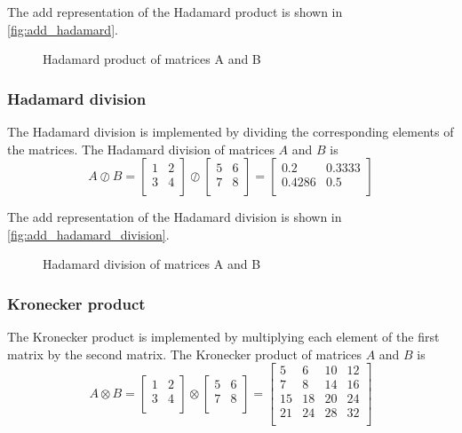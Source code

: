 The \gls{add} representation of the Hadamard product is shown in \autoref{fig:add_hadamard}.
\begin{figure}
    \centering
    
    \caption{Hadamard product of matrices A and B}
    \label{fig:add_hadamard}
\end{figure}

\subsubsection{Hadamard division}
The Hadamard division is implemented by dividing the corresponding elements of the matrices.
The Hadamard division of matrices $A$ and $B$ is
\[
A \oslash B = \begin{bmatrix}
    1 & 2 \\
    3 & 4 \\
\end{bmatrix} \oslash \begin{bmatrix}
    5 & 6 \\
    7 & 8 \\
\end{bmatrix} = \begin{bmatrix}
    0.2 & 0.3333 \\
    0.4286 & 0.5 \\
\end{bmatrix}
\]

The \gls{add} representation of the Hadamard division is shown in \autoref{fig:add_hadamard_division}.
\begin{figure}
    \centering
    
    \caption{Hadamard division of matrices A and B}
    \label{fig:add_hadamard_division}
\end{figure}

\subsubsection{Kronecker product}
The Kronecker product is implemented by multiplying each element of the first matrix by the second matrix.
The Kronecker product of matrices $A$ and $B$ is
\[
A \otimes B = \begin{bmatrix}
    1 & 2 \\
    3 & 4 \\
\end{bmatrix} \otimes \begin{bmatrix}
    5 & 6 \\
    7 & 8 \\
\end{bmatrix} = \begin{bmatrix}
    5 & 6 & 10 & 12 \\
    7 & 8 & 14 & 16 \\
    15 & 18 & 20 & 24 \\
    21 & 24 & 28 & 32 \\
\end{bmatrix}
\]

